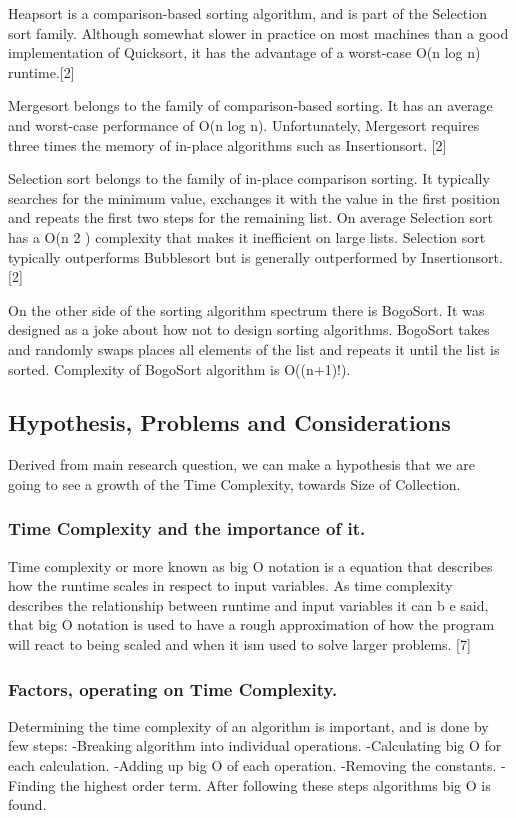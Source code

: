\documentclass[]{report}
\begin{document}
		Heapsort is a comparison-based sorting algorithm, and is part of the Selection sort family. Although somewhat slower in practice on most machines than a good implementation of Quicksort, it has the advantage of a worst-case O(n log n) runtime.[2]

		Mergesort belongs to the family of comparison-based sorting. It has an average and worst-case performance of O(n log n). Unfortunately, Mergesort requires three times the memory of in-place algorithms such as Insertionsort. [2]

		Selection sort belongs to the family of in-place comparison sorting. It typically searches for the minimum value, exchanges it with the value in the first position and repeats the first two steps for the remaining list. On average Selection sort has a O(n 2 ) complexity that makes it inefficient on large lists. Selection sort typically outperforms Bubblesort but is generally outperformed by Insertionsort.[2]

		On the other side of the sorting algorithm spectrum there is BogoSort. It was designed as a joke about how not to design sorting algorithms. BogoSort takes and randomly swaps places all elements of the list and repeats it until the list is sorted. Complexity of BogoSort algorithm is O((n+1)!).

\subsection{Hypothesis, Problems and Considerations}
Derived from main research question, we can make a hypothesis that we are going to see a growth of the Time Complexity, towards Size of Collection.
		\subsubsection{Time Complexity and the importance of it.}
		Time complexity or more known as big O notation is a equation that describes how the runtime scales in respect to input variables. As time complexity describes the relationship between runtime and input variables it can b e said, that big O notation is used to have a rough approximation of how the program will react to being scaled and when it ism used to solve larger problems. [7]
		\subsubsection{Factors, operating on Time Complexity.}
		Determining the time complexity of an algorithm is important, and is done by few steps:
			-Breaking algorithm into individual operations.
			-Calculating big O for each calculation.
			-Adding up big O of each operation.
			-Removing the constants.
			-Finding the highest order term.
		After following these steps algorithms big O is found.
		
\end{document}
